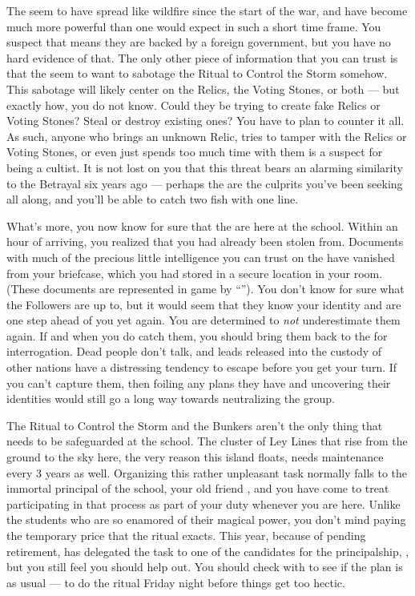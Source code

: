 \documentclass[char]{GL2020}
\begin{document}
The \pGoaties{} seem to have spread like wildfire since the start of the war, and have become much more powerful than one would expect in such a short time frame. You suspect that means they are backed by a foreign government, but you have no hard evidence of that. The only other piece of information that you can trust is that the \pGoaties{} seem to want to sabotage the Ritual to Control the Storm somehow. This sabotage will likely center on the Relics, the Voting Stones, or both — but exactly how, you do not know. Could they be trying to create fake Relics or Voting Stones? Steal or destroy existing ones? You have to plan to counter it all. As such, anyone who brings an unknown Relic, tries to tamper with the Relics or Voting Stones, or even just spends too much time with them is a suspect for being a cultist. It is not lost on you that this threat bears an alarming similarity to the Betrayal six years ago — perhaps the \pGoaties{} are the culprits you’ve been seeking all along, and you’ll be able to catch two fish with one line.

What's more, you now know for sure that the \pGoaties{} are here at the school. Within an hour of arriving, you realized that you had already been stolen from. Documents with much of the precious little intelligence you can trust on the \pGoaties{} have vanished from your briefcase, which you had stored in a secure location in your room. (These documents are represented in game by ``\iFolderOfNotes{}''). You don't know for sure what the Followers are up to, but it would seem that they know your identity and are one step ahead of you yet again. You are determined to \emph{not} underestimate them again. If and when you do catch them, you should bring them back to the \pShip{} for interrogation. Dead people don't talk, and leads released into the custody of other nations have a distressing tendency to escape before you get your turn. If you can't capture them, then foiling any plans they have and uncovering their identities would still go a long way towards neutralizing the group.

The Ritual to Control the Storm and the Bunkers aren't the only thing that needs to be safeguarded at the school. The cluster of Ley Lines that rise from the ground to the sky here, the very reason this island floats, needs maintenance every 3 years as well. Organizing this rather unpleasant task normally falls to the immortal principal of the school, your old friend \cPrincipal{}, and you have come to treat participating in that process as part of your duty whenever you are here. Unlike the students who are so enamored of their magical power, you don't mind paying the temporary price that the ritual exacts. This year, because of \cPrincipal{\their} pending retirement, \cPrincipal{} has delegated the task to one of the candidates for the principalship, \cBeetle{\intro}, but you still feel you should help out. You should check with \cBeetle{} to see if the plan is as usual — to do the ritual Friday night before things get too hectic.
\end{document}
